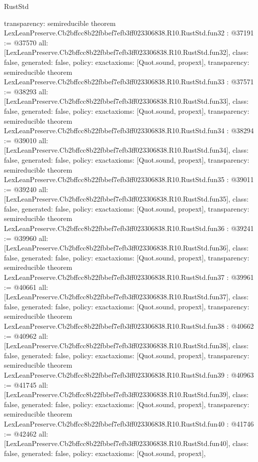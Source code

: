 \begin{lexlean}{RustStd}
\begin{coremodule}
{  transparency: semireducible
}
theorem LexLeanPreserve.Cb2bffcc8b22fbbef7efb3ff023306838.R10.RustStd.fun32 : @37191 := @37570 {
  all: [LexLeanPreserve.Cb2bffcc8b22fbbef7efb3ff023306838.R10.RustStd.fun32],
  class: false,
  generated: false,
  policy: exact{axioms: [Quot.sound, propext]},
  transparency: semireducible
}
theorem LexLeanPreserve.Cb2bffcc8b22fbbef7efb3ff023306838.R10.RustStd.fun33 : @37571 := @38293 {
  all: [LexLeanPreserve.Cb2bffcc8b22fbbef7efb3ff023306838.R10.RustStd.fun33],
  class: false,
  generated: false,
  policy: exact{axioms: [Quot.sound, propext]},
  transparency: semireducible
}
theorem LexLeanPreserve.Cb2bffcc8b22fbbef7efb3ff023306838.R10.RustStd.fun34 : @38294 := @39010 {
  all: [LexLeanPreserve.Cb2bffcc8b22fbbef7efb3ff023306838.R10.RustStd.fun34],
  class: false,
  generated: false,
  policy: exact{axioms: [Quot.sound, propext]},
  transparency: semireducible
}
theorem LexLeanPreserve.Cb2bffcc8b22fbbef7efb3ff023306838.R10.RustStd.fun35 : @39011 := @39240 {
  all: [LexLeanPreserve.Cb2bffcc8b22fbbef7efb3ff023306838.R10.RustStd.fun35],
  class: false,
  generated: false,
  policy: exact{axioms: [Quot.sound, propext]},
  transparency: semireducible
}
theorem LexLeanPreserve.Cb2bffcc8b22fbbef7efb3ff023306838.R10.RustStd.fun36 : @39241 := @39960 {
  all: [LexLeanPreserve.Cb2bffcc8b22fbbef7efb3ff023306838.R10.RustStd.fun36],
  class: false,
  generated: false,
  policy: exact{axioms: [Quot.sound, propext]},
  transparency: semireducible
}
theorem LexLeanPreserve.Cb2bffcc8b22fbbef7efb3ff023306838.R10.RustStd.fun37 : @39961 := @40661 {
  all: [LexLeanPreserve.Cb2bffcc8b22fbbef7efb3ff023306838.R10.RustStd.fun37],
  class: false,
  generated: false,
  policy: exact{axioms: [Quot.sound, propext]},
  transparency: semireducible
}
theorem LexLeanPreserve.Cb2bffcc8b22fbbef7efb3ff023306838.R10.RustStd.fun38 : @40662 := @40962 {
  all: [LexLeanPreserve.Cb2bffcc8b22fbbef7efb3ff023306838.R10.RustStd.fun38],
  class: false,
  generated: false,
  policy: exact{axioms: [Quot.sound, propext]},
  transparency: semireducible
}
theorem LexLeanPreserve.Cb2bffcc8b22fbbef7efb3ff023306838.R10.RustStd.fun39 : @40963 := @41745 {
  all: [LexLeanPreserve.Cb2bffcc8b22fbbef7efb3ff023306838.R10.RustStd.fun39],
  class: false,
  generated: false,
  policy: exact{axioms: [Quot.sound, propext]},
  transparency: semireducible
}
theorem LexLeanPreserve.Cb2bffcc8b22fbbef7efb3ff023306838.R10.RustStd.fun40 : @41746 := @42462 {
  all: [LexLeanPreserve.Cb2bffcc8b22fbbef7efb3ff023306838.R10.RustStd.fun40],
  class: false,
  generated: false,
  policy: exact{axioms: [Quot.sound, propext]},
}
\end{coremodule}
\end{lexlean}
